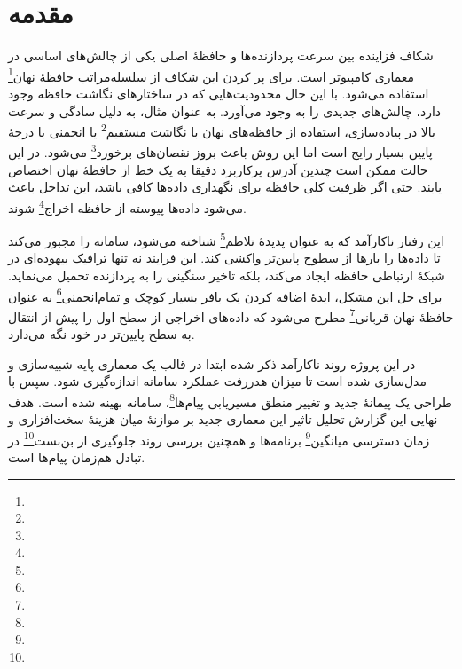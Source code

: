 \chapter{مقدمه}

شکاف فزاینده بین سرعت پردازنده‌ها و حافظهٔ اصلی یکی از چالش‌های اساسی در معماری کامپیوتر است. برای پر کردن این شکاف از سلسله‌مراتب حافظهٔ نهان\footnote{} استفاده می‌شود. با این حال محدودیت‌هایی که در ساختارهای نگاشت حافظه وجود دارد، چالش‌های جدیدی را به وجود می‌آورد. به عنوان مثال، به دلیل سادگی و سرعت بالا در پیاده‌سازی، استفاده از حافظه‌های نهان با نگاشت مستقیم\footnote{} یا انجمنی با درجهٔ پایین بسیار رایج است اما این روش باعث بروز نقصان‌های برخورد\footnote{} می‌شود. در این حالت ممکن است چندین آدرس پرکاربرد دقیقا به یک خط از حافظهٔ نهان اختصاص یابند. حتی اگر ظرفیت کلی حافظه برای نگهداری داده‌ها کافی باشد، این تداخل باعث می‌شود داده‌ها پیوسته از حافظه اخراج\footnote{} شوند.

این رفتار ناکارآمد که به عنوان پدیدهٔ تلاطم\footnote{} شناخته می‌شود، سامانه را مجبور می‌کند تا داده‌ها را بارها از سطوح پایین‌تر واکشی کند. این فرایند نه تنها ترافیک بیهوده‌ای در شبکهٔ ارتباطی حافظه ایجاد می‌کند، بلکه تاخیر سنگینی را به پردازنده تحمیل می‌نماید. برای حل این مشکل، ایدهٔ اضافه کردن یک بافر بسیار کوچک و تمام‌انجمنی\footnote{} به عنوان حافظهٔ نهان قربانی\footnote{} مطرح می‌شود که داده‌های اخراجی از سطح اول را پیش از انتقال به سطح پایین‌تر در خود نگه می‌دارد. 

در این پروژه روند ناکارآمد ذکر شده ابتدا در قالب یک معماری پایه شبیه‌سازی و مدل‌سازی شده است تا میزان هدررفت عملکرد سامانه اندازه‌گیری شود. سپس با طراحی یک پیمانهٔ جدید و تغییر منطق مسیریابی پیام‌ها\footnote{}، سامانه بهینه شده است. هدف نهایی این گزارش تحلیل تاثیر این معماری جدید بر موازنهٔ میان هزینهٔ سخت‌افزاری و زمان دسترسی میانگین\footnote{} برنامه‌ها و همچنین بررسی روند جلوگیری از بن‌بست\footnote{} در تبادل هم‌زمان پیام‌ها است.